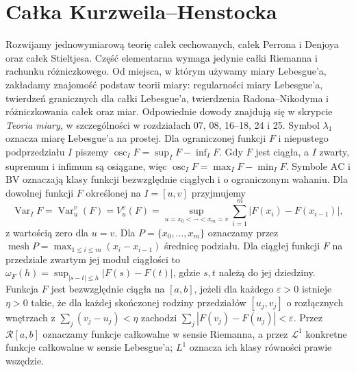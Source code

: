 \chapter{Całka Kurzweila--Henstocka}
\providecommand{\atlasref}[2]{#2}
\label{ma1:ch:kurzweil-henstock}\label{it:sec:kurzweil-henstock}
\begingroup
\providecommand{\osc}{\operatorname{osc}}
\providecommand{\Var}{\operatorname{Var}}
\providecommand{\mesh}{\operatorname{mesh}}
\providecommand{\supp}{\operatorname{supp}}
\providecommand{\AC}{\mathrm{AC}}
\providecommand{\BV}{\mathrm{BV}}
\providecommand{\HK}{\mathrm{KH}}
\providecommand{\ind}[1]{\chi_{#1}}
\providecommand{\Dn}{\underline D}
\providecommand{\Du}{\overline D}
\providecommand{\KS}{\mathrm{KS}}
Rozwijamy jednowymiarową teorię całek cechowanych, całek Perrona i Denjoya oraz całek Stieltjesa. Część elementarna wymaga jedynie całki Riemanna i rachunku różniczkowego. Od miejsca, w którym używamy miary Lebesgue'a, zakładamy znajomość podstaw teorii miary: regularności miary Lebesgue'a, twierdzeń granicznych dla całki Lebesgue'a, twierdzenia Radona--Nikodyma i różniczkowania całek oraz miar. Odpowiednie dowody znajdują się w skrypcie \emph{Teoria miary}, w szczególności w rozdziałach 07, 08, 16--18, 24 i 25. Symbol $\lambda_1$ oznacza miarę Lebesgue'a na prostej. Dla ograniczonej funkcji $F$ i niepustego podprzedziału $I$ piszemy $\osc_I F=\sup_I F-\inf_I F$. Gdy $F$ jest ciągła, a $I$ zwarty, supremum i infimum są osiągane, więc $\osc_I F=\max_I F-\min_I F$. Symbole $\AC$ i $\BV$ oznaczają klasy funkcji bezwzględnie ciągłych i o ograniczonym wahaniu. Dla dowolnej funkcji $F$ określonej na $I=[u,v]$ przyjmujemy
\[
 \Var_I F=\Var_u^v(F)=V_u^v(F)=\sup_{u=x_0<\cdots<x_m=v}\sum_{i=1}^m|F(x_i)-F(x_{i-1})|,
\]
z wartością zero dla $u=v$. Dla $P=\{x_0,\ldots,x_m\}$ oznaczamy przez $\mesh P=\max_{1\le i\le m}(x_i-x_{i-1})$ średnicę podziału. Dla ciągłej funkcji $F$ na przedziale zwartym jej moduł ciągłości to $\omega_F(h)=\sup_{|s-t|\le h}|F(s)-F(t)|$, gdzie $s,t$ należą do jej dziedziny. Funkcja $F$ jest bezwzględnie ciągła na $[a,b]$, jeżeli dla każdego $\varepsilon>0$ istnieje $\eta>0$ takie, że dla każdej skończonej rodziny przedziałów $[u_j,v_j]$ o rozłącznych wnętrzach z $\sum_j(v_j-u_j)<\eta$ zachodzi $\sum_j|F(v_j)-F(u_j)|<\varepsilon$. Przez $\mathcal R[a,b]$ oznaczamy funkcje całkowalne w sensie Riemanna, a przez $\mathcal L^1$ konkretne funkcje całkowalne w sensie Lebesgue'a; $L^1$ oznacza ich klasy równości prawie wszędzie.
 
